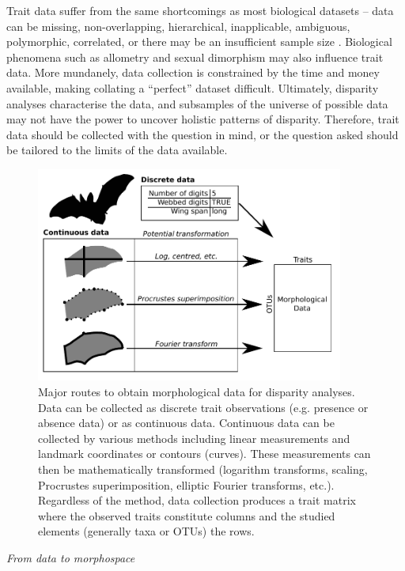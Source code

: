 \documentclass[12pt,letterpaper]{article}
\renewcommand{\subsection}[1]{%
\bigskip
\begin{center}
\begin{large}
\normalfont\itshape #1
\end{large}
\end{center}}
\begin{document}
Trait data suffer from the same shortcomings as most biological datasets -- data can be missing, non-overlapping, hierarchical, inapplicable, ambiguous, polymorphic, correlated, or there may be an insufficient sample size \citep{Brazeau2017-kg, Palci2018-ni}.
Biological phenomena such as allometry and sexual dimorphism may also influence trait data.
More mundanely, data collection is constrained by the time and money available, making collating a ``perfect'' dataset difficult.
Ultimately, disparity analyses characterise the data, and subsamples of the universe of possible data may not have the power to uncover holistic patterns of disparity.
Therefore, trait data should be collected with the question in mind, or the question asked should be tailored to the limits of the data available.

\begin{figure}[!htbp]
\centering
   \includegraphics[width=0.9\textwidth]{Figures/figure_data.pdf}
\caption{
    Major routes to obtain morphological data for disparity analyses. Data can be collected as discrete trait observations (e.g. presence or absence data) or as continuous data.
    Continuous data can be collected by various methods including linear measurements and landmark coordinates or contours (curves).
    These measurements can then be mathematically transformed (logarithm transforms, scaling, Procrustes superimposition, elliptic Fourier transforms, etc.).
    Regardless of the method, data collection produces a trait matrix where the observed traits constitute columns and the studied elements (generally taxa or OTUs) the rows.
}
\label{Fig:data}
\end{figure}


\subsection{From data to morphospace}
\end{document}
